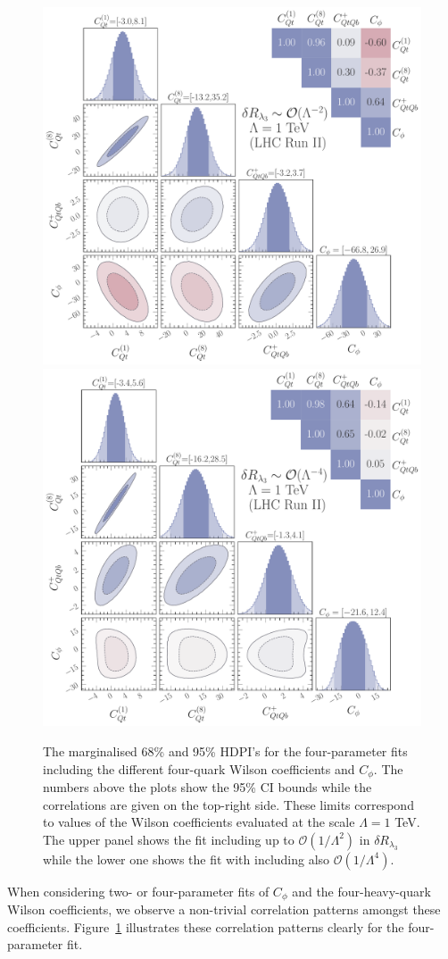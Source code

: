 \begin{figure}[t!]
	\begin{center}
		\includegraphics[width=.6\linewidth]{fig/4param_fit_LHC_RunII_l3L_rge}\\
		\includegraphics[width=.6\linewidth]{fig/4param_fit_LHC_RunII_l3Q_rge}
	\end{center}
	\caption{The marginalised 68\% and 95\% HDPI's for the four-parameter fits including the different four-quark Wilson coefficients and $C_\phi$. The numbers above the plots show the 95\% CI bounds while the correlations are given on the top-right side. 
		These limits correspond to values of the Wilson coefficients evaluated at the scale $\Lambda=1$ TeV. 
		The upper panel shows the fit including up to $\mathcal{O}(1/\Lambda^2)$ in $\delta R_{\lambda_3}$  while the lower one shows the fit with including also  $\mathcal{O}(1/\Lambda^4)$.  \label{fig:4param} }
\end{figure}
%
When considering two- or four-parameter fits of $C_\phi$ and the four-heavy-quark Wilson coefficients, we observe a non-trivial correlation patterns amongst these coefficients.  Figure~\ref{fig:4param} illustrates these correlation patterns clearly for the four-parameter fit. 
